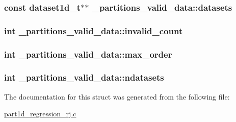 \subsubsection[{\texorpdfstring{datasets}{datasets}}]{\setlength{\rightskip}{0pt plus 5cm}const {\bf dataset1d\+\_\+t}$\ast$$\ast$ \+\_\+partitions\+\_\+valid\+\_\+data\+::datasets}\hypertarget{struct__partitions__valid__data_a6da49e27b8983847edbbccddcf6ea095}{}\label{struct__partitions__valid__data_a6da49e27b8983847edbbccddcf6ea095}
\subsubsection[{\texorpdfstring{invalid\+\_\+count}{invalid_count}}]{\setlength{\rightskip}{0pt plus 5cm}int \+\_\+partitions\+\_\+valid\+\_\+data\+::invalid\+\_\+count}\hypertarget{struct__partitions__valid__data_a81e550abce65cfa1419fed02a757e6d9}{}\label{struct__partitions__valid__data_a81e550abce65cfa1419fed02a757e6d9}
\subsubsection[{\texorpdfstring{max\+\_\+order}{max_order}}]{\setlength{\rightskip}{0pt plus 5cm}int \+\_\+partitions\+\_\+valid\+\_\+data\+::max\+\_\+order}\hypertarget{struct__partitions__valid__data_aa5dada8e61f09259a2887367247c8a1c}{}\label{struct__partitions__valid__data_aa5dada8e61f09259a2887367247c8a1c}
\subsubsection[{\texorpdfstring{ndatasets}{ndatasets}}]{\setlength{\rightskip}{0pt plus 5cm}int \+\_\+partitions\+\_\+valid\+\_\+data\+::ndatasets}\hypertarget{struct__partitions__valid__data_a3bcc831a5b99511cb41d0d555bd7d502}{}\label{struct__partitions__valid__data_a3bcc831a5b99511cb41d0d555bd7d502}


The documentation for this struct was generated from the following file\+:\begin{DoxyCompactItemize}
\item 
\hyperlink{part1d__regression__rj_8c}{part1d\+\_\+regression\+\_\+rj.\+c}\end{DoxyCompactItemize}
